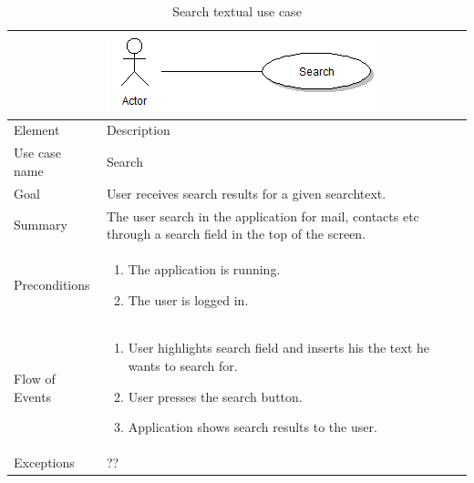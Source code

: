 \begin{table}
\begin{tabular}{p{3cm}p{12cm}}
& \includegraphics{search}\\ \hline
Element & Description \\ \hline
Use case name & Search \\
Goal & User receives search results for a given searchtext. \\
Summary & The user search in the application for mail, contacts etc through a search field in the top of the screen. \\
Preconditions &
\begin{enumerate}
\item{}The application is running.
\item{}The user is logged in.
\end{enumerate} \\ \hline
Flow of Events &
\begin{enumerate}
\item{}User highlights search field and inserts his the text he wants to search for.
\item{}User presses the search button.
\item{}Application shows search results to the user.
\end{enumerate} \\ \hline
Exceptions & ??
\end{tabular}
\caption{Search textual use case} \label{tab:search}
\end{table}

